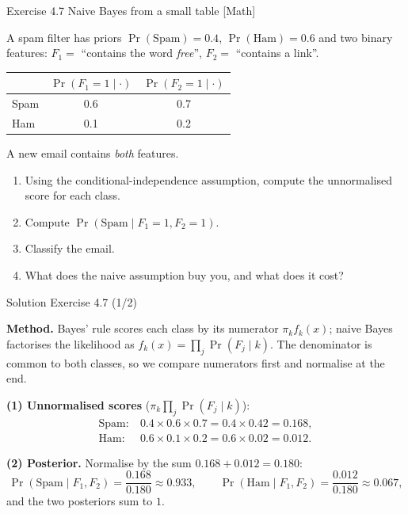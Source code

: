 \documentclass[aspectratio=169,11pt]{beamer}
\begin{document}

\begin{frame}{Exercise 4.7 \textemdash{} Naive Bayes from a small table [Math]}
\begin{exercise}
A spam filter has priors $\Pr(\text{Spam})=0.4$, $\Pr(\text{Ham})=0.6$
and two binary features: $F_1=$ ``contains the word \emph{free}'',
$F_2=$ ``contains a link''.
\begin{center}\small
\begin{tabular}{lcc}
\toprule
 & $\Pr(F_1=1\mid\cdot)$ & $\Pr(F_2=1\mid\cdot)$ \\
\midrule
Spam & 0.6 & 0.7 \\
Ham  & 0.1 & 0.2 \\
\bottomrule
\end{tabular}
\end{center}
A new email contains \emph{both} features.
\begin{enumerate}
  \item Using the conditional-independence assumption, compute the
        unnormalised score for each class.
  \item Compute $\Pr(\text{Spam}\mid F_1=1,F_2=1)$.
  \item Classify the email.
  \item What does the naive assumption buy you, and what does it cost?
\end{enumerate}
\end{exercise}
\end{frame}

\begin{frame}{Solution \textemdash{} Exercise 4.7 (1/2)}
\begin{solutionbox}
\textbf{Method.} Bayes' rule scores each class by its numerator
$\pi_k f_k(x)$; naive Bayes factorises the likelihood as
$f_k(x)=\prod_j\Pr(F_j\mid k)$. The denominator is common to both
classes, so we compare numerators first and normalise at the end.

\vspace{1mm}
\textbf{(1) Unnormalised scores} ($\pi_k\prod_j \Pr(F_j\mid k)$):
\[
\begin{aligned}
  \text{Spam}:&\ 0.4\times 0.6\times 0.7 = 0.4\times 0.42 = 0.168,\\
  \text{Ham}:&\ 0.6\times 0.1\times 0.2 = 0.6\times 0.02 = 0.012.
\end{aligned}
\]

\textbf{(2) Posterior.} Normalise by the sum $0.168+0.012=0.180$:
\[
  \Pr(\text{Spam}\mid F_1,F_2) = \frac{0.168}{0.180} \approx 0.933,
  \qquad
  \Pr(\text{Ham}\mid F_1,F_2) = \frac{0.012}{0.180} \approx 0.067 ,
\]
and the two posteriors sum to $1$. \checkmark
\end{solutionbox}
\end{frame}
\end{document}
